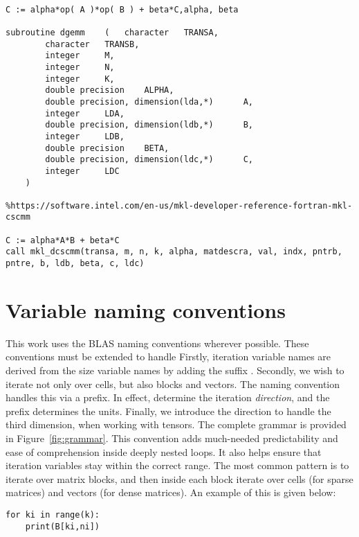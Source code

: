 \begin{verbatim}

C := alpha*op( A )*op( B ) + beta*C,alpha, beta

subroutine dgemm 	( 	character  	TRANSA,
		character  	TRANSB,
		integer  	M,
		integer  	N,
		integer  	K,
		double precision  	ALPHA,
		double precision, dimension(lda,*)  	A,
		integer  	LDA,
		double precision, dimension(ldb,*)  	B,
		integer  	LDB,
		double precision  	BETA,
		double precision, dimension(ldc,*)  	C,
		integer  	LDC 
	) 		

%https://software.intel.com/en-us/mkl-developer-reference-fortran-mkl-cscmm

C := alpha*A*B + beta*C
call mkl_dcscmm(transa, m, n, k, alpha, matdescra, val, indx, pntrb, pntre, b, ldb, beta, c, ldc)
\end{verbatim}

\section{Variable naming conventions}


This work uses the BLAS naming conventions wherever possible. These conventions must be extended to handle 
Firstly, iteration variable names are derived from the size variable names by adding the suffix . Secondly, we wish to iterate not only over cells, but also blocks and vectors. The naming convention handles this via a prefix. In effect,  determine the iteration \emph{direction}, and the prefix determines the units. Finally, we introduce the direction  to handle the third dimension, when working with tensors. The complete grammar is provided in Figure~\ref{fig:grammar}. This convention adds much-needed predictability and ease of comprehension inside deeply nested loops. It also helps ensure that iteration variables stay within the correct range. The most common pattern is to iterate over matrix blocks, and then inside each block iterate over cells (for sparse matrices) and vectors (for dense matrices). An example of this is given below:

\begin{verbatim}
for ki in range(k):
	print(B[ki,ni])
\end{verbatim}

